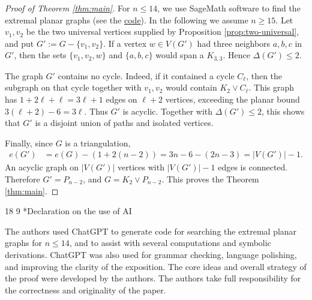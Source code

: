 \documentclass[11pt]{article}
\makeatletter
\renewcommand\section{\@startsection{section}{1}{\z@}%
{18\p@ \@plus 6\p@ \@minus 3\p@}%
{9\p@ \@plus 6\p@ \@minus 3\p@}%
{\large\bfseries\boldmath}}
\theoremstyle{plain}
\theoremstyle{definition}
\numberwithin{equation}{section}
\makeatother
\begin{document}
\begin{proof}[Proof of Theorem \ref{thm:main}]
For $n\leq 14$, we use SageMath software to find the extremal planar graphs (see the \href{https://github.com/ahhylau/Codes_for_max_planar_graphs_spectral_radius}{code}). In the following we assume $n\geq 15$.
Let $v_1,v_2$ be the two universal vertices supplied by Proposition
\ref{prop:two-universal}, and put $G':= G - \{v_1,v_2\}$.
If a vertex $w\in V(G')$ had three neighbors $a,b,c$ in $G'$, then
the sets $\{v_1,v_2,w\}$ and $\{a,b,c\}$ would span a $K_{3,3}$. Hence $\Delta(G')\leq 2$.

The graph $G'$ contains no cycle. Indeed, if it contained a cycle
$C_{\ell}$, then the subgraph on that cycle together with $v_1,v_2$ would
contain $K_2\vee C_{\ell}$. This graph has
$1 + 2\ell + \ell = 3\ell + 1$
edges on $\ell + 2$ vertices, exceeding the planar bound
$3(\ell + 2) - 6 = 3\ell$. Thus $G'$ is acyclic. Together with $\Delta(G')\leq 2$, this
shows that $G'$ is a disjoint union of paths and isolated vertices.

Finally, since $G$ is a triangulation,
\begin{align*}
e(G')
& = e(G) - (1 + 2(n-2)) = 3n - 6 - (2n - 3) = |V(G')| - 1.
\end{align*}
An acyclic graph on $|V(G')|$ vertices with $|V(G')|-1$ edges is
connected. Therefore $G' = P_{n-2}$, and
$G=K_2\vee P_{n-2}$.
This proves the Theorem \ref{thm:main}.
\end{proof}

\section*{Declaration on the use of AI}

The authors used ChatGPT to generate code for searching the extremal
planar graphs for $n\leq 14$, and to assist with several computations
and symbolic derivations. ChatGPT was also used for grammar checking,
language polishing, and improving the clarity of the exposition.
The core ideas and overall strategy of the proof were developed by the
authors. The authors take full responsibility for the correctness and
originality of the paper.
\end{document}
